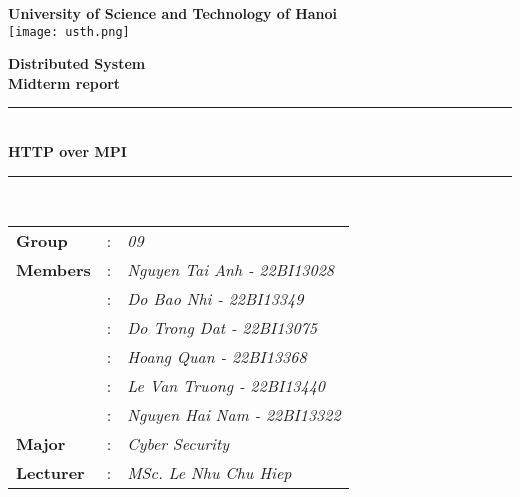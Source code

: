 \documentclass[a4paper,12pt]{article}
\begin{document}

\begin{center}
    \vspace{1cm}
    {\Large \textbf{University of Science and Technology of Hanoi}}\\[0.75cm]
    
    \texttt{[image: usth.png]}
    
    \vspace{1cm}
    {\large \textbf{Distributed System}}\\[0.5cm]
    {\large \textbf{Midterm report}}\\[0.5cm]

    \vspace{0.8cm}
    \rule{\textwidth}{0.75pt} \\[0.3cm]
    {\huge \textbf{HTTP over MPI}}\\[0.3cm]
    \rule{\textwidth}{0.75pt} \\[1.5cm]
\end{center}


\vspace{1cm}
\noindent
\begin{tabular}{>{\bfseries}l @{\hskip 0.5cm} c @{\hskip 0.5cm} l}
    Group       & : & \textit{09}\\[0.2cm]
    Members     & : & \textit{Nguyen Tai Anh - 22BI13028}\\[0.2cm]
                & : & \textit{Do Bao Nhi - 22BI13349}\\[0.2cm]
                & : & \textit{Do Trong Dat - 22BI13075}\\[0.2cm]
                & : & \textit{Hoang Quan - 22BI13368}\\[0.2cm]
                & : & \textit{Le Van Truong - 22BI13440}\\[0.2cm]
                & : & \textit{Nguyen Hai Nam - 22BI13322}\\[0.2cm]
    Major       & : & \textit{Cyber Security}             \\[0.2cm]
    Lecturer    & : & \textit{MSc. Le Nhu Chu Hiep}\\

\end{tabular}
\end{document}
